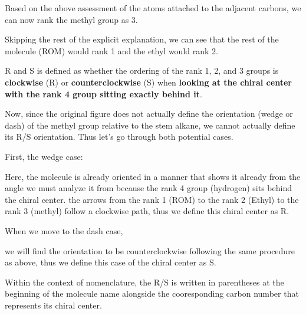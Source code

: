 \documentclass[10pt]{article}
\begin{document}
  
  

  Based on the above assessment of the atoms attached to the adjacent carbons, we can now rank the methyl group as 3.

  Skipping the rest of the explicit explanation, we can see that the rest of the molecule (ROM) would rank 1 and the ethyl would rank 2.


  
  

  R and S is defined as whether the ordering of the rank 1, 2, and 3 groups is \textbf{clockwise} (R) or \textbf{counterclockwise} (S) when \textbf{looking at the chiral center with the rank 4 group sitting exactly behind it}.

  
  Now, since the original figure does not actually define the orientation (wedge or dash) of the methyl group relative to the stem alkane, we cannot actually define its R/S orientation. Thus let's go through both potential cases.

  First, the wedge case:


  Here, the molecule is already oriented in a manner that shows it already from the angle we must analyze it from because the rank 4 group (hydrogen) sits behind the chiral center. the arrows from the rank 1 (ROM) to the rank 2 (Ethyl) to the rank 3 (methyl) follow a clockwise path, thus we define this chiral center as R.


  When we move to the dash case, 


  we will find the orientation to be counterclockwise following the same procedure as above, thus we define this case of the chiral center as S.

  Within the context of nomenclature, the R/S is written in parentheses at the beginning of the molecule name alongside the cooresponding carbon number that represents its chiral center.
\end{document}
